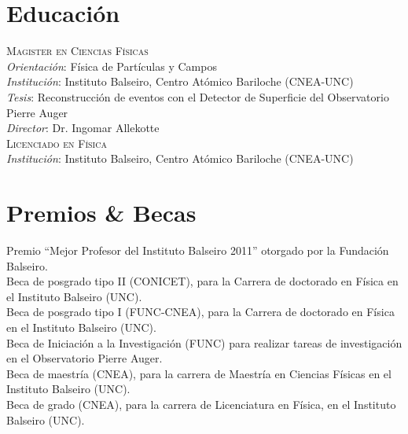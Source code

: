 \section*{Educación}
\noindent
\textsc{Magister en Ciencias Físicas}\\
{\emph{Orientación}}: Física de Partículas y Campos\\
{\emph{Institución}}: Instituto Balseiro, Centro Atómico Bariloche (CNEA-UNC)\\
{\emph{Tesis}}: Reconstrucción de eventos con el Detector de Superficie del Observatorio Pierre Auger\\
{\emph{Director}}: Dr. Ingomar Allekotte\\ 
\textsc{Licenciado en Física}\\
{\emph{Institución}}: Instituto Balseiro, Centro Atómico Bariloche (CNEA-UNC)\\
\fi

\section*{Premios \& Becas}
\noindent
{}Premio ``Mejor Profesor del Instituto Balseiro 2011'' otorgado por la Fundación Balseiro.\\
Beca de posgrado tipo II (CONICET), para la Carrera de doctorado en Física en el Instituto Balseiro (UNC).\\
Beca de posgrado tipo I (FUNC-CNEA), para la Carrera de doctorado en Física en el Instituto Balseiro (UNC).\\
Beca de Iniciación a la Investigación (FUNC) para realizar tareas de investigación en el Observatorio Pierre Auger.\\
Beca de maestría (CNEA), para la carrera de Maestría en Ciencias Físicas en el Instituto Balseiro (UNC).\\
Beca de grado (CNEA), para la carrera de Licenciatura en Física, en el Instituto Balseiro (UNC).
